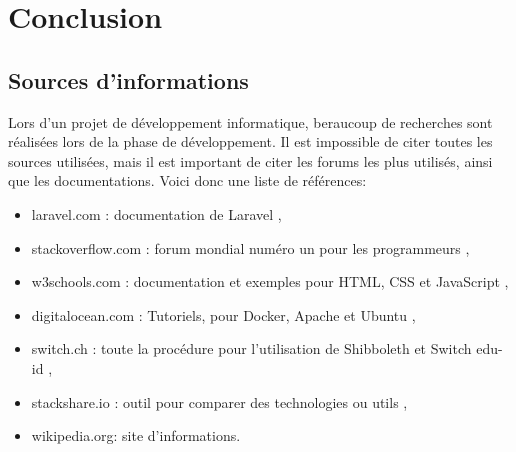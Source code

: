 \documentclass[
    iai, %
    il, %
]{heig-tb}
\begin{document}



\chapter{Conclusion}



\section{Sources d'informations}
Lors d'un projet de développement informatique, beraucoup de recherches sont réalisées lors de la
phase de développement. Il est impossible de citer toutes les sources utilisées, mais il est
important de citer les forums les plus utilisés, ainsi que les documentations.\newline
Voici donc une liste de références:

\begin{itemize}
    \item laravel.com : documentation de Laravel \cite{laravel},
    \item stackoverflow.com : forum mondial numéro un pour les programmeurs \cite{stackoverflow},
    \item w3schools.com : documentation et exemples pour HTML, CSS et JavaScript \cite{w3schools},
    \item digitalocean.com : Tutoriels, pour Docker, Apache et Ubuntu \cite{digitalocean},
    \item switch.ch : toute la procédure pour l’utilisation de Shibboleth et Switch edu-id \cite{switch},
    \item stackshare.io : outil pour comparer des technologies ou utils \cite{stackshare},
    \item wikipedia.org: site d'informations.
\end{itemize}
\end{document}
